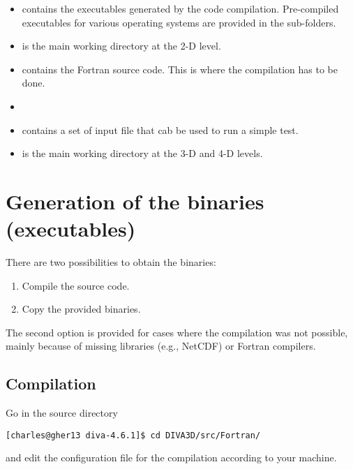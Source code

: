\begin{itemize}
\item {} contains the executables generated by the code compilation. Pre-compiled executables for various operating systems are provided in the sub-folders.
\item {} is the main working directory at the 2-D level. 
\item {} contains the Fortran source code. This is where the compilation has to be done.
\item[]
\item {} contains a set of input file that cab be used to run a simple test.
\item {} is the main working directory at the 3-D and 4-D levels.
\end{itemize}

\section{Generation of the binaries (executables)}

There are two possibilities to obtain the binaries: 
\begin{enumerate}
\item Compile the source code.
\item Copy the provided binaries.
\end{enumerate}
The second option is provided for cases where the compilation was not possible, mainly because of missing libraries (e.g., NetCDF) or Fortran compilers.

\subsection{Compilation\label{sec:compilation}}

Go in the source directory 
\begin{lstlisting}[style=Bash]
[charles@gher13 diva-4.6.1]$ cd DIVA3D/src/Fortran/
\end{lstlisting}
and edit the configuration file  for the compilation according to your machine. 


